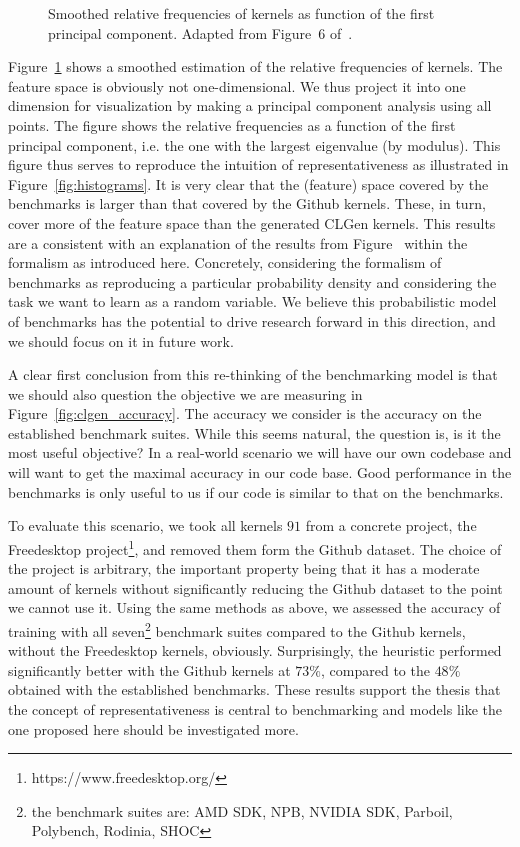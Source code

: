 \begin{figure}[h]
	\centering
\resizebox{0.95\textwidth}{!}{
     
     }
   \caption{Smoothed relative frequencies of kernels as function of the first principal component. Adapted from Figure~6 of~\cite{goens_mapl19}.}
   \label{fig:clgen_pca}
\end{figure}

Figure~\ref{fig:clgen_pca} shows a smoothed estimation of the relative frequencies of kernels. The feature space is obviously not one-dimensional. We thus project it into one dimension for visualization by making a principal component analysis using all points.
The figure shows the relative frequencies as a function of the first principal component, i.e. the one with the largest eigenvalue (by modulus). 
This figure thus serves to reproduce the intuition of representativeness as illustrated in Figure~\ref{fig:histograms}.
It is very clear that the (feature) space covered by the benchmarks is larger than that covered by the Github kernels. These, in turn, cover more of the feature space than the generated CLGen kernels.
This results are a consistent with an explanation of the results from Figure~\cite{fig:clgen_acuracy} within the formalism as introduced here.
Concretely, considering the formalism of benchmarks as reproducing a particular probability density and considering the task we want to learn as a random variable.
We believe this probabilistic model of benchmarks has the potential to drive research forward in this direction, and we should focus on it in future work.

A clear first conclusion from this re-thinking of the benchmarking model is that we should also question the objective we are measuring in Figure~\ref{fig:clgen_accuracy}.
The accuracy we consider is the accuracy on the established benchmark suites.
While this seems natural, the question is, is it the most useful objective?
In a real-world scenario we will have our own codebase and will want to get the maximal accuracy in our code base.
Good performance in the benchmarks is only useful to us if our code is similar to that on the benchmarks. 

To evaluate this scenario, we took all kernels $91$ from a concrete project, the Freedesktop project\footnote{https://www.freedesktop.org/}, and removed them form the Github dataset.
The choice of the project is arbitrary, the important property being that it has a moderate amount of kernels without significantly reducing the Github dataset to the point we cannot use it.
Using the same methods as above, we assessed the accuracy of training with all seven\footnote{the benchmark suites are: AMD SDK, NPB, NVIDIA SDK, Parboil, Polybench, Rodinia, SHOC} benchmark suites compared to the Github kernels, without the Freedesktop kernels, obviously.
Surprisingly, the heuristic performed significantly better with the Github kernels at $73\%$, compared to the $48\%$ obtained with the established benchmarks.
These results support the thesis that the concept of representativeness is central to benchmarking and models like the one proposed here should be investigated more.

